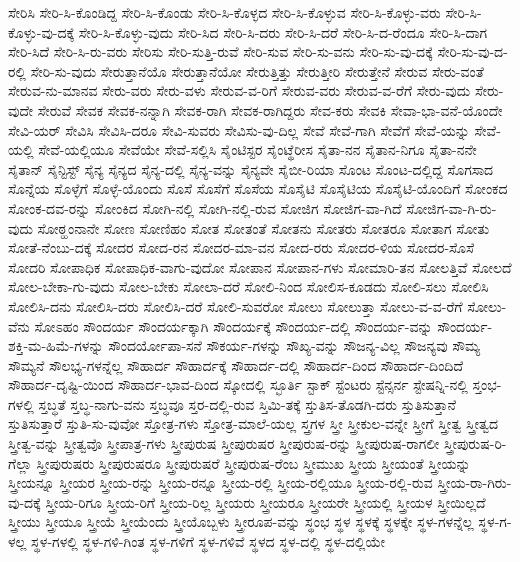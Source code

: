 {ಸೇರಿಸಿ
ಸೇರಿ-ಸಿ-ಕೊಂಡಿದ್ದ
ಸೇರಿ-ಸಿ-ಕೊಂಡು
ಸೇರಿ-ಸಿ-ಕೊಳ್ಳದ
ಸೇರಿ-ಸಿ-ಕೊಳ್ಳುವ
ಸೇರಿ-ಸಿ-ಕೊಳ್ಳು-ವರು
ಸೇರಿ-ಸಿ-ಕೊಳ್ಳು-ವು-ದಕ್ಕೆ
ಸೇರಿ-ಸಿ-ಕೊಳ್ಳು-ವುದು
ಸೇರಿ-ಸಿದ
ಸೇರಿ-ಸಿ-ದರು
ಸೇರಿ-ಸಿ-ದರೆ
ಸೇರಿ-ಸಿ-ದ-ರೆಂದೂ
ಸೇರಿ-ಸಿ-ದಾಗ
ಸೇರಿ-ಸಿದೆ
ಸೇರಿ-ಸಿ-ರು-ವರು
ಸೇರಿಸು
ಸೇರಿ-ಸುತ್ತಿ-ರುವೆ
ಸೇರಿ-ಸುವ
ಸೇರಿ-ಸು-ವನು
ಸೇರಿ-ಸು-ವು-ದಕ್ಕೆ
ಸೇರಿ-ಸು-ವು-ದ-ರಲ್ಲಿ
ಸೇರಿ-ಸು-ವುದು
ಸೇರುತ್ತಾನೆಯೊ
ಸೇರುತ್ತಾನೆಯೋ
ಸೇರುತ್ತಿತ್ತು
ಸೇರುತ್ತೀರಿ
ಸೇರುತ್ತೇನೆ
ಸೇರುವ
ಸೇರು-ವಂತೆ
ಸೇರುವ-ನು-ಮಾನವ
ಸೇರು-ವರು
ಸೇರು-ವಳು
ಸೇರುವ-ವ-ರಿಗೆ
ಸೇರುವ-ವರು
ಸೇರುವ-ವ-ರೆಗೆ
ಸೇರು-ವುದು
ಸೇರು-ವುದೇ
ಸೇರುವೆ
ಸೇವಕ
ಸೇವಕ-ನನ್ನಾಗಿ
ಸೇವಕ-ರಾಗಿ
ಸೇವಕ-ರಾಗಿದ್ದರು
ಸೇವ-ಕರು
ಸೇವಕಿ
ಸೇವಾ-ಭಾ-ವನೆ-ಯೊಂದೇ
ಸೇವಿ-ಯರ್
ಸೇವಿಸಿ
ಸೇವಿಸಿ-ದರೂ
ಸೇವಿ-ಸುವರು
ಸೇವಿಸು-ವು-ದಿಲ್ಲ
ಸೇವೆ
ಸೇವೆ-ಗಾಗಿ
ಸೇವೆಗೆ
ಸೇವೆ-ಯನ್ನು
ಸೇವೆ-ಯಲ್ಲಿ
ಸೇವೆ-ಯಲ್ಲಿಯೂ
ಸೇವೆಯೇ
ಸೇವೆ-ಸಲ್ಲಿಸಿ
ಸೈಂಟಿಸ್ಟರ
ಸೈಂಟ್ಥೆರೀಸ
ಸೈತಾ-ನನ
ಸೈತಾನ-ನಿಗೂ
ಸೈತಾ-ನನೇ
ಸೈತಾನ್
ಸೈನ್ಟಿಸ್ಟ್
ಸೈನ್ಯ
ಸೈನ್ಯದ
ಸೈನ್ಯ-ದಲ್ಲಿ
ಸೈನ್ಯ-ವನ್ನು
ಸೈನ್ಯವೇ
ಸೈಬೀ-ರಿಯಾ
ಸೊಂಟ
ಸೊಂಟ-ದಲ್ಲಿದ್ದ
ಸೊಗಸಾದ
ಸೊನ್ನೆಯ
ಸೊಳ್ಳೆಗೆ
ಸೊಳ್ಳೆ-ಯೊಂದು
ಸೊಸೆ
ಸೊಸೆಗೆ
ಸೊಸೆಯ
ಸೊಸೈಟಿ
ಸೊಸೈಟಿಯ
ಸೊಸೈಟಿ-ಯೊಂದಿಗೆ
ಸೋಂಕದ
ಸೋಂಕ-ದವ-ರನ್ನು
ಸೋಂಕಿದ
ಸೋಗಿ-ನಲ್ಲಿ
ಸೋಗಿ-ನಲ್ಲಿ-ರುವ
ಸೋಜಿಗ
ಸೋಜಿಗ-ವಾ-ಗಿದೆ
ಸೋಜಿಗ-ವಾ-ಗಿ-ರು-ವುದು
ಸೋಠ್ಹಂನಾನೇ
ಸೋಣ
ಸೋಣಿಹಂ
ಸೋತ
ಸೋತಂತೆ
ಸೋತನು
ಸೋತರು
ಸೋತರೂ
ಸೋತಾಗ
ಸೋತು
ಸೋತೆ-ನೆಂಬು-ದಕ್ಕೆ
ಸೋದರ
ಸೋದ-ರನ
ಸೋದರ-ಮಾ-ವನ
ಸೋದ-ರರು
ಸೋದರ-ಳಿಯ
ಸೋದರ-ಸೊಸೆ
ಸೋದರಿ
ಸೋಪಾಧಿಕ
ಸೋಪಾಧಿಕ-ವಾಗು-ವುದೋ
ಸೋಪಾನ
ಸೋಪಾನ-ಗಳು
ಸೋಮಾರಿ-ತನ
ಸೋಲತ್ತಿವೆ
ಸೋಲದೆ
ಸೋಲ-ಬೇಕಾ-ಗು-ವುದು
ಸೋಲ-ಬೇಕು
ಸೋಲಾ-ದರೆ
ಸೋಲಿ-ನಿಂದ
ಸೋಲಿಸ-ಕೂಡದು
ಸೋಲಿ-ಸಲು
ಸೋಲಿಸಿ
ಸೋಲಿಸಿ-ದನು
ಸೋಲಿಸಿ-ದರು
ಸೋಲಿಸಿ-ದರೆ
ಸೋಲಿ-ಸುವರೋ
ಸೋಲು
ಸೋಲುತ್ತಾ
ಸೋಲು-ವ-ವ-ರೆಗೆ
ಸೋಲು-ವೆನು
ಸೋಽಹಂ
ಸೌಂದರ್ಯ
ಸೌಂದರ್ಯಕ್ಕಾಗಿ
ಸೌಂದರ್ಯಕ್ಕೆ
ಸೌಂದರ್ಯ-ದಲ್ಲಿ
ಸೌಂದರ್ಯ-ವನ್ನು
ಸೌಂದರ್ಯ-ಶಕ್ತಿ-ಮ-ಹಿಮೆ-ಗಳನ್ನು
ಸೌಂದರ್ಯೋಪಾ-ಸನೆ
ಸೌಕರ್ಯ-ಗಳನ್ನು
ಸೌಖ್ಯ-ವನ್ನು
ಸೌಜನ್ಯ-ವಿಲ್ಲ
ಸೌಜನ್ಯವು
ಸೌಮ್ಯ
ಸೌಮ್ಯನೆ
ಸೌಲಭ್ಯ-ಗಳನ್ನೆಲ್ಲ
ಸೌಹಾರ್ದ
ಸೌಹಾರ್ದಕ್ಕೆ
ಸೌಹಾರ್ದ-ದಲ್ಲಿ
ಸೌಹಾರ್ದ-ದಿಂದ
ಸೌಹಾರ್ದ-ದಿಂದಿದೆ
ಸೌಹಾರ್ದ-ದೃಷ್ಟಿ-ಯಿಂದ
ಸೌಹಾರ್ದ-ಭಾವ-ದಿಂದ
ಸ್ಕೋದಲ್ಲಿ
ಸ್ಛೂರ್ತಿ
ಸ್ಟಾಕ್
ಸ್ಟೆಂಟರು
ಸ್ಟೆನ್ಸರ್ನ
ಸ್ಟೇಷನ್ನಿ-ನಲ್ಲಿ
ಸ್ತಂಭ-ಗಳಲ್ಲಿ
ಸ್ತಬ್ಧತೆ
ಸ್ತಬ್ಧ-ನಾಗು-ವನು
ಸ್ತಬ್ಧವೂ
ಸ್ತರ-ದಲ್ಲಿ-ರುವ
ಸ್ತಿಮಿ-ತಕ್ಕೆ
ಸ್ತುತಿಸ-ತೊಡಗಿ-ದರು
ಸ್ತುತಿಸುತ್ತಾನೆ
ಸ್ತುತಿಸುತ್ತಾರೆ
ಸ್ತುತಿ-ಸು-ವುವೋ
ಸ್ತೋತ್ರ-ಗಳು
ಸ್ತೋತ್ರ-ಮಾಲೆ-ಯಲ್ಲ
ಸ್ತ್ರಗಳ
ಸ್ತ್ರೀ
ಸ್ತ್ರೀಕುಲ-ವನ್ನೇ
ಸ್ತ್ರೀಗೆ
ಸ್ತ್ರೀತ್ವ
ಸ್ತ್ರೀತ್ವದ
ಸ್ತ್ರೀತ್ವ-ವನ್ನು
ಸ್ತ್ರೀತ್ವವೊ
ಸ್ತ್ರೀಪಾತ್ರ-ಗಳು
ಸ್ತ್ರೀಪುರುಷ
ಸ್ತ್ರೀಪುರುಷರ
ಸ್ತ್ರೀಪುರುಷ-ರನ್ನು
ಸ್ತ್ರೀಪುರುಷ-ರಾಗಲೀ
ಸ್ತ್ರೀಪುರುಷ-ರಿ-ಗೆಲ್ಲಾ
ಸ್ತ್ರೀಪುರುಷರು
ಸ್ತ್ರೀಪುರುಷರೂ
ಸ್ತ್ರೀಪುರುಷರೆ
ಸ್ತ್ರೀಪುರುಷ-ರೆಂಬ
ಸ್ತ್ರೀಮುಖ
ಸ್ತ್ರೀಯ
ಸ್ತ್ರೀಯಂತೆ
ಸ್ತ್ರೀಯನ್ನು
ಸ್ತ್ರೀಯನ್ನೂ
ಸ್ತ್ರೀಯರ
ಸ್ತ್ರೀಯ-ರನ್ನು
ಸ್ತ್ರೀಯ-ರನ್ನೂ
ಸ್ತ್ರೀಯ-ರಲ್ಲಿ
ಸ್ತ್ರೀಯ-ರಲ್ಲಿಯೂ
ಸ್ತ್ರೀಯ-ರಲ್ಲಿ-ರುವ
ಸ್ತ್ರೀಯ-ರಾ-ಗಿರು-ವು-ದಕ್ಕೆ
ಸ್ತ್ರೀಯ-ರಿಗೂ
ಸ್ತ್ರೀಯ-ರಿಗೆ
ಸ್ತ್ರೀಯ-ರಿಲ್ಲ
ಸ್ತ್ರೀಯರು
ಸ್ತ್ರೀಯರೂ
ಸ್ತ್ರೀಯರೇ
ಸ್ತ್ರೀಯಲ್ಲಿ
ಸ್ತ್ರೀಯಳ
ಸ್ತ್ರೀಯಿಲ್ಲದೆ
ಸ್ತ್ರೀಯು
ಸ್ತ್ರೀಯೂ
ಸ್ತ್ರೀಯೆ
ಸ್ತ್ರೀಯೆಂದು
ಸ್ತ್ರೀಯೊಬ್ಬಳು
ಸ್ತ್ರೀರೂಪ-ವನ್ನು
ಸ್ಥಂಭ
ಸ್ಥಳ
ಸ್ಥಳಕ್ಕೆ
ಸ್ಥಳಕ್ಕೇ
ಸ್ಥಳ-ಗಳನ್ನೆಲ್ಲ
ಸ್ಥಳ-ಗ-ಳಲ್ಲ
ಸ್ಥಳ-ಗಳಲ್ಲಿ
ಸ್ಥಳ-ಗಳಿ-ಗಿಂತ
ಸ್ಥಳ-ಗಳಿಗೆ
ಸ್ಥಳ-ಗಳಿವೆ
ಸ್ಥಳದ
ಸ್ಥಳ-ದಲ್ಲಿ
ಸ್ಥಳ-ದಲ್ಲಿಯೇ
}
